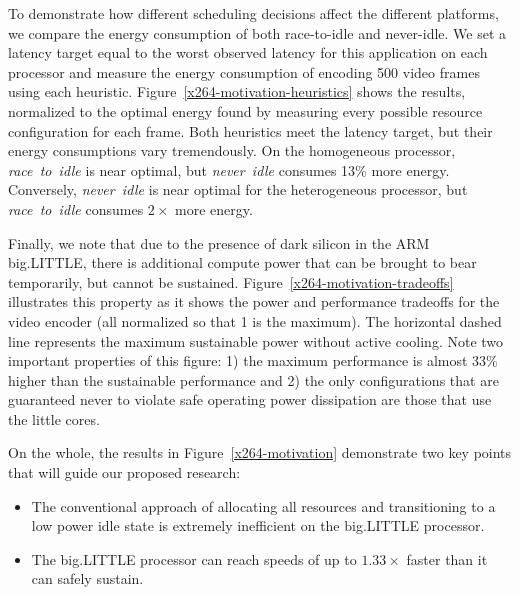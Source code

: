 To demonstrate how different scheduling decisions affect the different
platforms, we compare the energy consumption of both race-to-idle and
never-idle.  We set a latency target equal to the worst observed
latency for this application on each processor and measure the energy
consumption of encoding 500 video frames using each heuristic.
Figure~\ref{x264-motivation-heuristics} shows the results, normalized to
the optimal energy found by measuring every possible resource
configuration for each frame.  Both heuristics meet the latency
target, but their energy consumptions vary tremendously. On the
homogeneous processor, \emph{race~to~idle} is near optimal, but
\emph{never~idle} consumes 13\% more energy.  Conversely,
\emph{never~idle} is near optimal for the heterogeneous processor, but
\emph{race~to~idle} consumes $2 \times$ more energy.

Finally, we note that due to the presence of dark silicon in the ARM
big.LITTLE, there is additional compute power that can be brought to
bear temporarily, but cannot be sustained.
Figure~\ref{x264-motivation-tradeoffs} illustrates this property as it
shows the power and performance tradeoffs for the video encoder (all
normalized so that 1 is the maximum).  The horizontal dashed line
represents the maximum sustainable power without active cooling.  Note
two important properties of this figure: 1) the maximum performance is
almost 33\% higher than the sustainable performance and 2) the only
configurations that are guaranteed never to violate safe operating
power dissipation are those that use the little cores.

On the whole, the results in Figure~\ref{x264-motivation} demonstrate
two key points that will guide our proposed research:
\begin{itemize}
\item The conventional approach of allocating all resources and
transitioning to a low power idle state is extremely inefficient on
the big.LITTLE processor.  
\item The big.LITTLE processor can reach speeds of up to $1.33 \times$
  faster than it can safely sustain.
\end{itemize}

